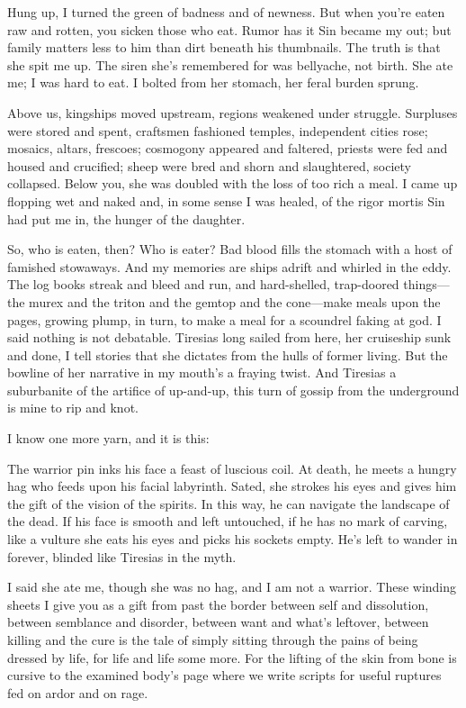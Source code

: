 \documentclass[
]{memoir}
\begin{document}
Hung up, I turned the green of badness and of newness. But when you're
eaten raw and rotten, you sicken those who eat. Rumor has it Sin became
my out; but family matters less to him than dirt beneath his thumbnails.
The truth is that she spit me up. The siren she's remembered for was
bellyache, not birth. She ate me; I was hard to eat. I bolted from her
stomach, her feral burden sprung.

Above us, kingships moved upstream, regions weakened under struggle.
Surpluses were stored and spent, craftsmen fashioned temples,
independent cities rose; mosaics, altars, frescoes; cosmogony appeared
and faltered, priests were fed and housed and crucified; sheep were bred
and shorn and slaughtered, society collapsed. Below you, she was doubled
with the loss of too rich a meal. I came up flopping wet and naked and,
in some sense I was healed, of the rigor mortis Sin had put me in, the
hunger of the daughter.

So, who is eaten, then? Who is eater? Bad blood fills the stomach with a
host of famished stowaways. And my memories are ships adrift and whirled
in the eddy. The log books streak and bleed and run, and hard-shelled,
trap-doored things---the murex and the triton and the gemtop and the
cone---make meals upon the pages, growing plump, in turn, to make a meal
for a scoundrel faking at god. I said nothing is not debatable. Tiresias
long sailed from here, her cruiseship sunk and done, I tell stories that
she dictates from the hulls of former living. But the bowline of her
narrative in my mouth's a fraying twist. And Tiresias a suburbanite of
the artifice of up-and-up, this turn of gossip from the underground is
mine to rip and knot.

I know one more yarn, and it is this:

The warrior pin inks his face a feast of luscious coil. At death, he
meets a hungry hag who feeds upon his facial labyrinth. Sated, she
strokes his eyes and gives him the gift of the vision of the spirits. In
this way, he can navigate the landscape of the dead. If his face is
smooth and left untouched, if he has no mark of carving, like a vulture
she eats his eyes and picks his sockets empty. He's left to wander in
forever, blinded like Tiresias in the myth.

I said she ate me, though she was no hag, and I am not a warrior. These
winding sheets I give you as a gift from past the border between self
and dissolution, between semblance and disorder, between want and what's
leftover, between killing and the cure is the tale of simply sitting
through the pains of being dressed by life, for life and life some more.
For the lifting of the skin from bone is cursive to the examined body's
page where we write scripts for useful ruptures fed on ardor and on
rage.
\end{document}
